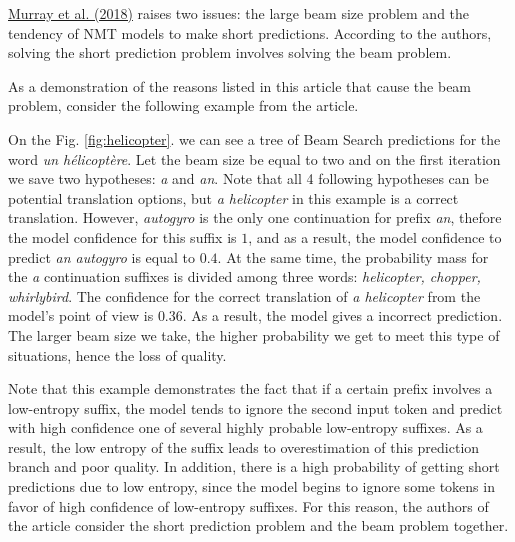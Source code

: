 \documentclass[a4paper,14pt]{extarticle}
\newcommand{\bibref}[3]{\hyperlink{#1}{#2 (#3)}}
\begin{document}
	\bibref{corr_len_bias}{Murray et al.}{2018} raises two issues: the large beam size problem and the tendency of NMT models to make short predictions. According to the authors, solving the short prediction problem involves solving the beam problem.
	
	As a demonstration of the reasons listed in this article that cause the beam problem, consider the following example from the article.
	
	\begin{figure}[t]
		
	\end{figure}
	
	On the Fig. \ref{fig:helicopter}. we can see a tree of Beam Search predictions for the word \textit{un hélicoptère}. Let the beam size be equal to two and on the first iteration we save two hypotheses: \textit{a} and \textit{an}. Note that all 4 following hypotheses can be potential translation options, but \textit{a helicopter} in this example is a correct translation. However, \textit{autogyro} is the only one continuation for prefix \textit{an}, thefore the model confidence for this suffix is $1$, and as a result, the model confidence to predict \textit{an autogyro} is equal to $0.4$. At the same time, the probability mass for the \textit{a} continuation suffixes is divided among three words: \textit{helicopter, chopper, whirlybird}. The confidence for the correct translation of \textit{a helicopter} from the model's point of view is $0.36$. As a result, the model gives a incorrect prediction. The larger beam size we take, the higher probability we get to meet this type of situations, hence the loss of quality.
	
	Note that this example demonstrates the fact that if a certain prefix involves a low-entropy suffix, the model tends to ignore the second input token and predict with high confidence one of several highly probable low-entropy suffixes. As a result, the low entropy of the suffix leads to overestimation of this prediction branch and poor quality. In addition, there is a high probability of getting short predictions due to low entropy, since the model begins to ignore some tokens in favor of high confidence of low-entropy suffixes. For this reason, the authors of the article consider the short prediction problem and the beam problem together.
	
\end{document}
